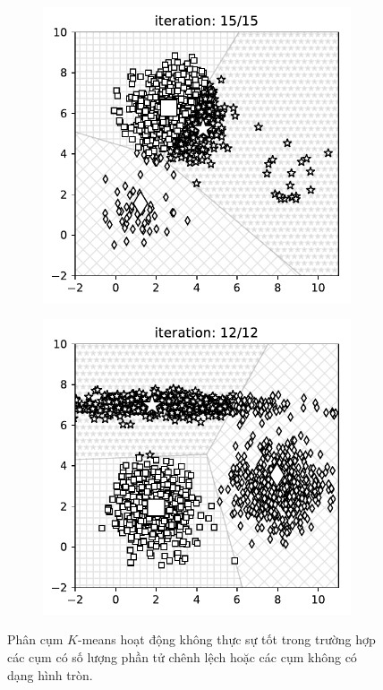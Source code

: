 \begin{figure}[ht]
\begin{subfigure}{0.49\textwidth}

\includegraphics[width=0.8\linewidth]{ebookML_src/src/kmeans/skew_10.pdf}
\caption{}
\label{fig:4_disa}
\end{subfigure}
\begin{subfigure}{0.49\textwidth}

\includegraphics[width=0.8\linewidth]{ebookML_src/src/kmeans/notround_10.pdf}
\caption{}
\label{fig:4_disb}
\end{subfigure}
\caption{
Phân cụm $K$-means hoạt động không thực sự tốt trong trường hợp các
cụm có số lượng phần tử chênh lệch hoặc các cụm không có dạng
hình tròn.
}
\label{fig:4_dis}
\end{figure}



